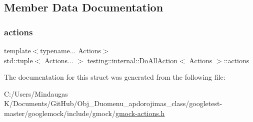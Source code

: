 \subsection{Member Data Documentation}
\mbox{\label{structtesting_1_1internal_1_1_do_all_action_a613b209674f808b2662ccb9279b59994}} 
\subsubsection{\texorpdfstring{actions}{actions}}
{\footnotesize\ttfamily template$<$typename... Actions$>$ \\
std\+::tuple$<$ Actions... $>$ \mbox{\hyperlink{structtesting_1_1internal_1_1_do_all_action}{testing\+::internal\+::\+Do\+All\+Action}}$<$ Actions $>$\+::actions}



The documentation for this struct was generated from the following file\+:\begin{DoxyCompactItemize}
\item 
C\+:/\+Users/\+Mindaugas K/\+Documents/\+Git\+Hub/\+Obj\+\_\+\+Duomenu\+\_\+apdorojimas\+\_\+class/googletest-\/master/googlemock/include/gmock/\mbox{\hyperlink{googletest-master_2googlemock_2include_2gmock_2gmock-actions_8h}{gmock-\/actions.\+h}}\end{DoxyCompactItemize}
